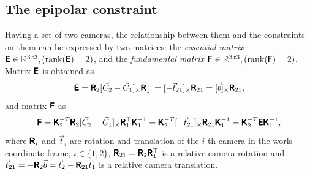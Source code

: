 \subsection{The epipolar constraint}
Having a set of two cameras, the relationship between them and the constraints on them can be expressed by two matrices: the \textit{essential matrix} $\pmb{\mathsf{E}} \in \mathbb{R}^{3x3},(\operatorname{rank}(\pmb{\mathsf{E}}) = 2)$, and the \textit{fundamental matrix} $\pmb{\mathsf{F}} \in \mathbb{R}^{3x3}, (\operatorname{rank}(\pmb{\mathsf{F}}) = 2)$. Matrix $\pmb{\mathsf{E}}$ is obtained as
\begin{equation}
    \label{eq:E}
    \pmb{\mathsf{E}} = \pmb{\mathsf{R}}_2 [\vec{C}_2 - \vec{C}_1]_{\times} \pmb{\mathsf{R}}_1^\top = [-\vec{t}_{21}]_{\times} \pmb{\mathsf{R}}_{21} = [\vec{b}]_{\times} \pmb{\mathsf{R}}_{21},
\end{equation}
and matrix $\pmb{\mathsf{F}}$ as
\begin{equation}
    \label{eq:F}
    \pmb{\mathsf{F}} = \pmb{\mathsf{K}}_2^{-T} \pmb{\mathsf{R}}_2 [\vec{C}_2 - \vec{C}_1]_{\times} \pmb{\mathsf{R}}_1^\top \pmb{\mathsf{K}}_1^{-1} = 
    \pmb{\mathsf{K}}_2^{-T} [-\vec{t}_{21}]_{\times} \pmb{\mathsf{R}}_{21} \pmb{\mathsf{K}}_1^{-1} = 
    \pmb{\mathsf{K}}_2^{-T} \pmb{\mathsf{E}} \pmb{\mathsf{K}}_1^{-1},
\end{equation}
where 
$\pmb{\mathsf{R}}_i$ and $\vec{t}_i$ are rotation and translation of the $i$-th camera in the worls coordinate frame, $i \in \{1, 2\}$,
$\pmb{\mathsf{R}}_{21} = \pmb{\mathsf{R}}_2 \pmb{\mathsf{R}}_1^\top$ is a relative camera rotation and 
$\vec{t}_{21} = -\pmb{\mathsf{R}}_2 \vec{b} = \vec{t}_2 - \pmb{\mathsf{R}}_{21}\vec{t}_1$ is a relative camera translation.

